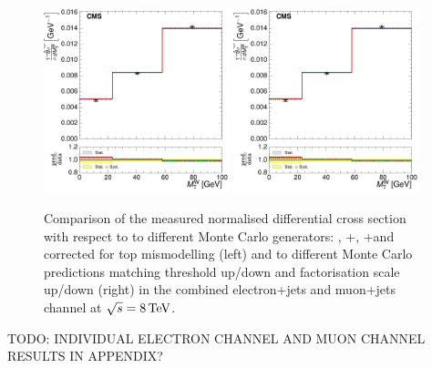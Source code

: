 \begin{figure}[hbtp]
    \centering
     \includegraphics[width=0.48\textwidth]{Chapters/04_Analysis/04b_XSections/images/results/8TeV/MT/central/normalised_xsection_combined_different_generators.pdf}\hfill
     \includegraphics[width=0.48\textwidth]{Chapters/04_Analysis/04b_XSections/images/results/8TeV/MT/central/normalised_xsection_combined_systematics_shifts.pdf}\hfill
     \caption{Comparison of the measured normalised differential cross section with respect to \mt to
     different Monte Carlo generators: \MADGRAPH, \POWHEG+\HERWIG, \POWHEG+\PYTHIA and \MADGRAPH corrected for
     top \pt mismodelling (left) and to different Monte Carlo predictions matching threshold up/down and
     factorisation scale up/down (right) in the combined electron+jets and muon+jets channel at
     $\sqrt{s}=8\,\text{Te\hspace{-.08em}V}$.}
     \label{fig:result_WPT_8TeV_combined}
\end{figure}

TODO: INDIVIDUAL ELECTRON CHANNEL AND MUON CHANNEL RESULTS IN APPENDIX? 
